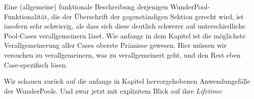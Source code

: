 
Eine (allgemeine) funktionale Beschreibung derjenigen WunderPool-Funktionalität, die der Überschrift der gegenständigen Sektion gerecht wird, ist insofern sehr schwierig, als dass sich diese deutlich schwerer auf unterschiedliche Pool-Cases verallgemeinern lässt. Wie anfangs in dem Kapitel  ist die möglichste Verallgemeinerung aller Cases oberste Prämisse gewesen. Hier müssen wir versuchen zu verallgemeinern, was zu verallgemeinert geht, und den Rest eben Case-spezifisch lösen. 

\vspace{0.3cm}

Wir schauen zurück auf die anfangs in Kapitel  hervorgehobenen Anwendungsfälle der WunderPools. Und zwar jetzt mit explizitem Blick auf ihre \textit{Lifetime}:

